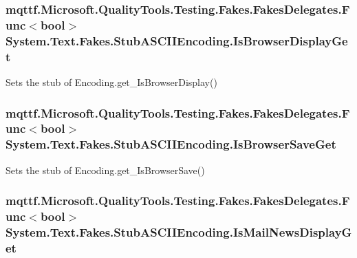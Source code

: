 \hypertarget{class_system_1_1_text_1_1_fakes_1_1_stub_a_s_c_i_i_encoding_ab7a2b86f181790af8cb8ce6691b8365d}{
\subsubsection[{Is\-Browser\-Display\-Get}]{\setlength{\rightskip}{0pt plus 5cm}mqttf.\-Microsoft.\-Quality\-Tools.\-Testing.\-Fakes.\-Fakes\-Delegates.\-Func$<$bool$>$ System.\-Text.\-Fakes.\-Stub\-A\-S\-C\-I\-I\-Encoding.\-Is\-Browser\-Display\-Get}}\label{class_system_1_1_text_1_1_fakes_1_1_stub_a_s_c_i_i_encoding_ab7a2b86f181790af8cb8ce6691b8365d}


Sets the stub of Encoding.\-get\-\_\-\-Is\-Browser\-Display()

\hypertarget{class_system_1_1_text_1_1_fakes_1_1_stub_a_s_c_i_i_encoding_a2b99d73180781f26d8430c636e5eca8b}{
\subsubsection[{Is\-Browser\-Save\-Get}]{\setlength{\rightskip}{0pt plus 5cm}mqttf.\-Microsoft.\-Quality\-Tools.\-Testing.\-Fakes.\-Fakes\-Delegates.\-Func$<$bool$>$ System.\-Text.\-Fakes.\-Stub\-A\-S\-C\-I\-I\-Encoding.\-Is\-Browser\-Save\-Get}}\label{class_system_1_1_text_1_1_fakes_1_1_stub_a_s_c_i_i_encoding_a2b99d73180781f26d8430c636e5eca8b}


Sets the stub of Encoding.\-get\-\_\-\-Is\-Browser\-Save()

\hypertarget{class_system_1_1_text_1_1_fakes_1_1_stub_a_s_c_i_i_encoding_a1e0fd9223348c3085ccc82b8fa9364e9}{
\subsubsection[{Is\-Mail\-News\-Display\-Get}]{\setlength{\rightskip}{0pt plus 5cm}mqttf.\-Microsoft.\-Quality\-Tools.\-Testing.\-Fakes.\-Fakes\-Delegates.\-Func$<$bool$>$ System.\-Text.\-Fakes.\-Stub\-A\-S\-C\-I\-I\-Encoding.\-Is\-Mail\-News\-Display\-Get}}\label{class_system_1_1_text_1_1_fakes_1_1_stub_a_s_c_i_i_encoding_a1e0fd9223348c3085ccc82b8fa9364e9}


